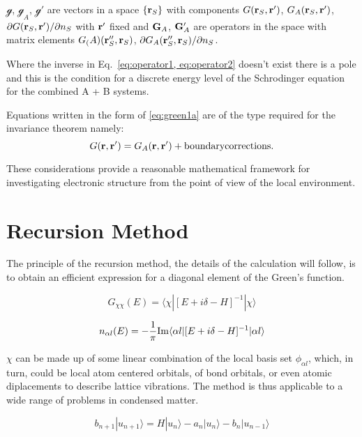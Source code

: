 \documentclass{article}
\def\ket{\rangle}
\def\bra{\langle}
\def\G{{\bf G}}
\def\r{{\bf r}}
\def\g{\mathcal{g}}
\begin{document}
$\g$, $\g_{A}$, $\g'$ are vectors in a space $\{\r_{S}\}$ with components $G(\r_{S},\r')$,
$G_{A}(\r_{S},\r')$, $\partial G(\r_{S},\r')/\partial n_{S}$ with $\r'$ fixed and
$\G_{A}$, $\G'_{A}$ are operators in the space with matrix elements
$G_(A)(\r''_{S}, \r_{S})$, $\partial G_{A}(\r''_{S}, \r_{S})/\partial n_{S}$.

Where the inverse in Eq.~\ref{eq:operator1, eq:operator2} 
doesn't exist there is a pole and this is the condition
for a discrete energy level of the Schrodinger equation 
for the combined A + B systems. 

Equations written in the form of \ref{eq:green1a} are of the type required for the invariance theorem namely:
\begin{equation}
G(\r,\r') = G_{A}(\r,\r') + {\rm boundary corrections}.
\end{equation}

These considerations provide a reasonable mathematical framework for 
investigating electronic structure from the point of view of the local environment.

\section{Recursion Method}
The principle of the recursion method, the details of the calculation will follow, is 
to obtain an efficient expression for a diagonal element of the Green's function.

\begin{equation}
G_{\chi\chi}(E) = \bra\chi|[E + i\delta -H]^{-1}|\chi\ket
\end{equation}

\begin{equation}
n_{\alpha l}(E) = -\frac{1}{\pi} {\rm Im}\bra\alpha l|[E + i\delta -H]^{-1}|\alpha l\ket
\end{equation}

$\chi$ can be made up of some linear combination of the local basis set $\phi_{\alpha l}$,
which, in turn, could be local atom centered orbitals, of bond orbitals, 
or even atomic diplacements to describe lattice vibrations. The method is thus
applicable to a wide range of problems in condensed matter.

\begin{equation}
b_{n+1}|u_{n+1}\ket = H |u_{n}\ket - a_{n}|u_{n}\ket - b_{n}|u_{n-1}\ket
\end{equation}
\end{document}
